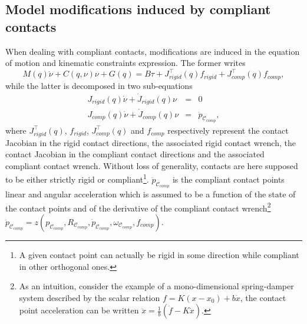 \documentclass[12pt,a4paper,twoside]{article}
\begin{document}
\subsection{Model modifications induced by compliant contacts}

When dealing with compliant contacts, modifications are induced in the equation of motion and kinematic constraints expression. The former writes
\begin{equation}
{M}(q) {\dot{\nu}}+{C}({q},{\nu}){\nu} + G(q) = {B} {\tau} + J^\top_{rigid} (q) f_{rigid} + J^\top_{comp} (q) f_{comp}, \label{eq:compliant dyn model}
\end{equation}
while the latter is decomposed in two sub-equations
\begin{subequations}\label{eq:kin constraints}
\begin{eqnarray}
J_{rigid}(q) \dot\nu + \dot{J}_{rigid}(q) \nu & = & 0 \label{eq:kin constraints rigid}\\  
J_{comp}(q) \dot\nu + \dot{J}_{comp}(q) \nu & = & \ddot{p}_{\mathcal{C}_{comp}}\label{eq:kin constraints comp},%
\end{eqnarray}               
\end{subequations}
where $J^\top_{rigid} (q)$, $f_{rigid}$, $J^\top_{comp} (q)$ and $f_{comp}$ respectively represent the contact Jacobian in the rigid contact directions, the associated rigid contact wrench, the contact Jacobian in the compliant contact directions and the associated compliant contact wrench. Without loss of generality, contacts are here supposed to be either strictly rigid or compliant\footnote{A given contact point can actually be rigid in some direction while compliant in other orthogonal ones.}. $\ddot{p}_{\mathcal{C}_{comp}}$ is the compliant contact points linear and angular acceleration which is assumed to be a function of the state of the contact points and of the derivative of the compliant contact wrench\footnote{As an intuition, consider the example of a mono-dimensional spring-damper system described by the scalar relation $ f = K (x-x_0) + b \dot{x} $, the contact point acceleration can be written $\ddot{x} = \frac{1}{b} ( \dot{f} - K \dot{x})$.} $\ddot{p}_{\mathcal{C}_{comp}} = z\left(p_{\mathcal{C}_{comp}},R_{\mathcal{C}_{comp}},\dot{p}_{\mathcal{C}_{comp}},\omega_{\mathcal{C}_{comp}},f_{comp}\right)$.

 
\end{document}
